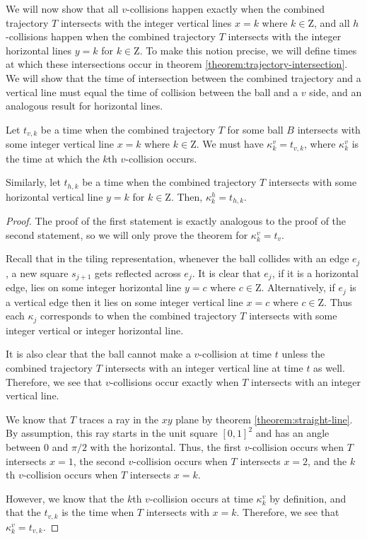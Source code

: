 We will now show that all $v$-collisions happen exactly when the combined trajectory $T$ intersects with the integer vertical lines $x = k$ where $k \in \mathrm{Z}$, and all $h$-collisions happen when the combined trajectory $T$ intersects with the integer horizontal lines $y = k$ for $k \in \mathrm{Z}$. To make this notion precise, we will define times at which these intersections occur in theorem \ref{theorem:trajectory-intersection}. We will show that the time of intersection between the combined trajectory and a vertical line must equal the time of collision between the ball and a $v$ side, and an analogous result for horizontal lines.

\begin{theorem}
  \label{theorem:trajectory-intersection}
  Let $t_{v, k}$ be a time when the combined trajectory $T$ for some ball $B$ intersects with some integer vertical line $x = k$ where $k \in \mathrm{Z}$. We must have $\kappa^v_k = t_{v, k}$, where $\kappa^v_k$ is the time at which the $k$th $v$-collision occurs.

  Similarly, let $t_{h, k}$ be a time when the combined trajectory $T$ intersects with some horizontal vertical line $y = k$ for $k \in \mathrm{Z}$. Then, $\kappa^h_k = t_{h, k}$.
\end{theorem}
\begin{proof}
  The proof of the first statement is exactly analogous to the proof of the second statement, so we will only prove the theorem for $\kappa^v_k = t_v$.

  Recall that in the tiling representation, whenever the ball collides with an edge $e_j$, a new square $s_{j+1}$ gets reflected across $e_j$. It is clear that $e_j$, if it is a horizontal edge, lies on some integer horizontal line $y = c$ where $c \in \mathrm{Z}$. Alternatively, if $e_j$ is a vertical edge then it lies on some integer vertical line $x = c$ where $c \in \mathrm{Z}$. Thus each $\kappa_j$ corresponds to when the combined trajectory $T$ intersects with some integer vertical or integer horizontal line.

  It is also clear that the ball cannot make a $v$-collision at time $t$ unless the combined trajectory $T$ intersects with an integer vertical line at time $t$ as well. Therefore, we see that $v$-collisions occur exactly when $T$ intersects with an integer vertical line.

  We know that $T$ traces a ray in the $xy$ plane by theorem \ref{theorem:straight-line}. By assumption, this ray starts in the unit square $[0,1]^2$ and has an angle between $0$ and $\pi/2$ with the horizontal. Thus, the first $v$-collision occurs when $T$ intersects $x = 1$, the second $v$-collision occurs when $T$ intersects $x = 2$, and the $k$th $v$-collision occurs when $T$ intersects $x = k$.

  However, we know that the $k$th $v$-collision occurs at time $\kappa^v_{k}$ by definition, and that the $t_{v, k}$ is the time when $T$ intersects with $x = k$. Therefore, we see that $\kappa^v_{k} = t_{v, k}$.
\end{proof}

